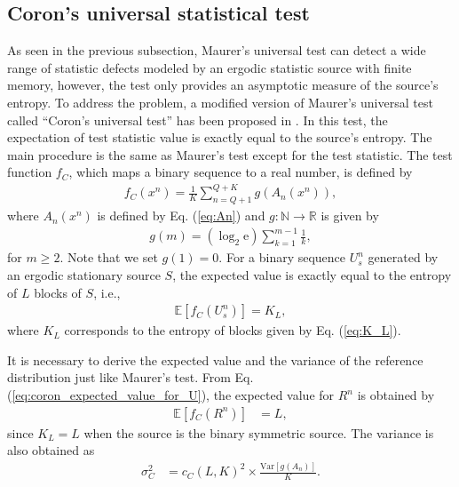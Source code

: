 \subsection{Coron's universal statistical test}
As seen in the previous subsection, Maurer's universal test can detect a wide range of statistic defects modeled by an ergodic statistic source with finite memory, however, the test only provides an asymptotic measure of the source's entropy. 
%
To address the problem, a modified version of Maurer's universal test called ``Coron's universal test'' has been proposed in \cite{coron1999security}. In this test, the expectation of test statistic value is exactly equal to the source's entropy. The main procedure is the same as Maurer's test except for the test statistic. The test function $f_C$, which maps a binary sequence to a real number, is defined by 
\begin{align}\label{eq:fC}
	f_C(x^n) = \frac{1}{K} \sum_{n=Q+1}^{Q+K} g(A_n(x^n)),
\end{align}
where $A_n(x^n)$ is defined by Eq. (\ref{eq:An}) and $g:\mathbb{N}\to\mathbb{R}$ is given by
\begin{align}\label{eq:function_g}
	g(m) = (\log_2 \mathrm{e}) \sum_{k=1}^{m-1}\frac{1}{k},
\end{align}
for $m\geq 2$. Note that we set $g(1)=0$.
%
For a binary sequence $U_s^n$ generated by an ergodic stationary source $S$, the expected value is exactly equal to the entropy of $L$ blocks of $S$, i.e.,
\begin{align}\label{eq:coron_expected_value_for_U}
	\mathbb{E}[f_C(U_s^n)] = K_L,
\end{align}
where $K_L$ corresponds to the entropy of blocks given by Eq. (\ref{eq:K_L}).
%
\par
It is necessary to derive the expected value and the variance of the reference distribution just like Maurer's test. From Eq. (\ref{eq:coron_expected_value_for_U}), the expected value for $R^n$ is obtained by
\begin{align}
\label{eq:coron_expected_value_truly_random}
	\mathbb{E}[f_C(R^n)] &= L, 
\end{align}
since $K_L=L$ when the source is the binary symmetric source. 
The variance is also obtained as
\begin{align}
	\sigma_C^2 &= c_C(L,K)^2 \times	\frac{\mathrm{Var}[g(A_n)]}{K}.
\end{align}
